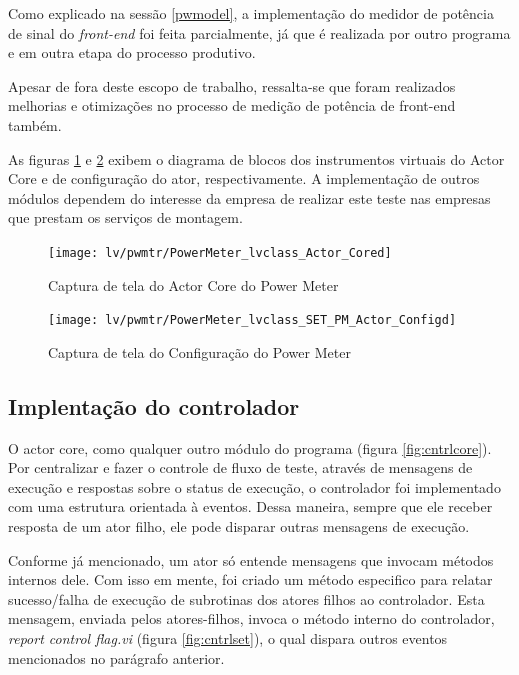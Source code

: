             Como explicado na sessão \ref{pwmodel}, a implementação do medidor de potência de sinal do \textit{front-end} foi feita parcialmente, já que é realizada por outro programa e em outra etapa do processo produtivo.
            
            Apesar de fora deste escopo de trabalho, ressalta-se que foram realizados melhorias e otimizações no processo de medição de potência de front-end também.
            
            As figuras \ref{fig:pwcore} e \ref{fig:pwconf} exibem o diagrama de blocos dos instrumentos virtuais do Actor Core e de configuração do ator, respectivamente. A implementação de outros módulos dependem do interesse da empresa de realizar este teste nas empresas que prestam os serviços de montagem.
            
            \begin{figure}
                \centering
                \texttt{[image: lv/pwmtr/PowerMeter\_lvclass\_Actor\_Cored]}
                \caption{Captura de tela do Actor Core do Power Meter}
                \label{fig:pwcore}
            \end{figure}
            \begin{figure}
                \centering
                \texttt{[image: lv/pwmtr/PowerMeter\_lvclass\_SET\_PM\_Actor\_Configd]}
                \caption{Captura de tela do Configuração do Power Meter}
                \label{fig:pwconf}
            \end{figure}
        \clearpage
        \subsection{Implentação do controlador}
        
        O actor core, como qualquer outro módulo do programa (figura \ref{fig:cntrlcore}). Por centralizar e fazer o controle de fluxo de teste, através de mensagens de execução e respostas sobre o status de execução, o controlador foi implementado com uma estrutura orientada à eventos. Dessa maneira, sempre que ele receber resposta de um ator filho, ele pode disparar outras mensagens de execução.
        
        Conforme já mencionado, um ator só entende mensagens que invocam métodos internos dele. Com isso em mente, foi criado um método especifico para relatar sucesso/falha de execução de subrotinas dos atores filhos ao controlador. Esta mensagem, enviada pelos atores-filhos, invoca o método interno do controlador, \textit{report control flag.vi} (figura \ref{fig:cntrlset}), o qual dispara outros eventos mencionados no parágrafo anterior.
        
